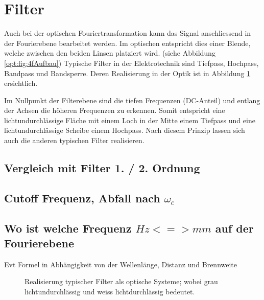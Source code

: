 %
%
%
%
\section{Filter
\label{opt:section:filter}}

Auch bei der optischen Fouriertransformation kann das Signal anschliessend in der Fourierebene bearbeitet werden.
Im optischen entspricht dies einer Blende, welche zwischen den beiden Linsen platziert wird. 
(siehe Abbildung \ref{opt:fig:4fAufbau})
Typische Filter in der Elektrotechnik sind Tiefpass, Hochpass, Bandpass und Bandsperre.
Deren Realisierung in der Optik ist in Abbildung \ref{opt:fig:filterarten} ersichtlich.

Im Nullpunkt der Filterebene sind die tiefen Frequenzen (DC-Anteil) und entlang der Achsen die höheren Frequenzen zu erkennen.
Somit entspricht eine lichtundurchlässige Fläche mit einem Loch in der Mitte einem Tiefpass und eine lichtundurchlässige Scheibe einem Hochpass.
Nach diesem Prinzip lassen sich auch die anderen typischen Filter realisieren.

\subsection{Vergleich mit Filter 1. / 2. Ordnung}

\subsection{Cutoff Frequenz, Abfall nach $\omega_c$}

\subsection{Wo ist welche Frequenz $Hz <=> mm$ auf der Fourierebene}
Evt Formel in Abhängigkeit von der Wellenlänge, Distanz und Brennweite

\begin{figure}
    \centering

    \hfill
    \hfill
    \hfill
    \caption{Realisierung typischer Filter als optische Systeme;
        wobei grau lichtundurchlässig und weiss lichtdurchlässig bedeutet.}
    \label{opt:fig:filterarten}
\end{figure}
